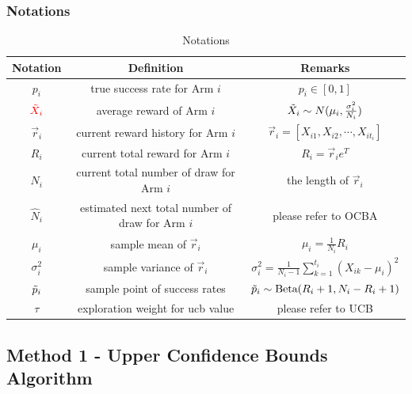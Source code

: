 \documentclass[compress]{beamer}
\begin{document}
\begin{frame}
\frametitle{Notations}
\begin{table}[htbp]
  \tiny
  \centering
  \caption{Notations}
    \begin{tabular}{ccc}
    \toprule
    Notation &  Definition & Remarks\\
    \midrule
    $p_{i}$ & true success rate for Arm $i$ & $p_{i} \in [0,1]$\\    
    ${\color{red}\Tilde X_{i}}$ & average reward of Arm $i$ & $\Tilde X_{i} \sim N(\mu_{i}, \frac{\sigma_{i}^{2}}{N_{i}})$ \\
    {\color{red}$\vec r_{i}$} & current reward history for Arm $i$ & $\vec r_{i} = [X_{i1}, X_{i2}, \cdots, X_{i t_{i}}]$ \\
    {\color{red}$R_{i}$} & current total reward for Arm $i$ & $R_{i} = \vec r_{i} e^{T}$ \\
    {\color{red}$N_{i}$} & current total number of draw for Arm $i$ & the length of $\vec r_{i}$ \\
    {\color{red}$\hat N_{i}$} & estimated next total number of draw for Arm $i$ & please refer to OCBA \\
    $\mu_{i}$ & sample mean of $\vec r_{i}$ & $\mu_{i} = \frac{1}{N_{i}} R_{i}$ \\
    $\sigma_{i}^{2}$ & sample variance of $\vec r_{i}$ & $\sigma_{i}^{2} = \frac{1}{N_{i} - 1} \sum_{k=1}^{t_{i}} (X_{ik} - \mu_{i})^{2}$ \\
    {\color{red}$\Tilde p_{i}$} & sample point of success rates & $\Tilde p_{i} \sim \mbox{Beta}(R_{i}+1, N_{i}-R_{i}+1)$ \\
    $\tau$ & exploration weight for ucb value & please refer to UCB \\
    \bottomrule
    \end{tabular}%
  \label{tab:notations}%
\end{table}%
\end{frame}

\subsection{Method 1 - Upper Confidence Bounds Algorithm}
\end{document}
